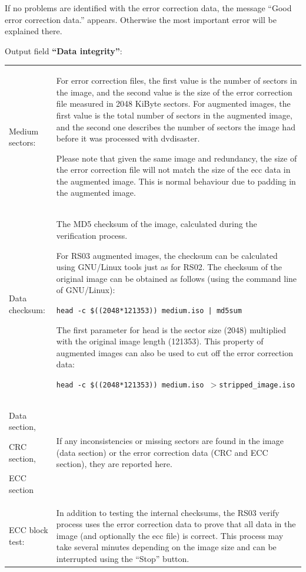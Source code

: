 If no problems are identified with the error correction data,
the message ``\textcolor{dkgreen}{Good error correction data.}'' appears.
Otherwise the most important error will be explained there. 

\bigskip

Output field {\bf ``Data integrity''}:

\medskip

\begin{tabular}{p{29mm}p{125mm}}
  Medium sectors: &
  For error correction files, the first value is the number of
  sectors in the image, and the second value is the size of
  the error correction file measured in 2048 KiByte sectors.
  For augmented images, the first value is the total number of
  sectors in the augmented image, and the second one describes
  the number of sectors the image had before it was processed with dvdisaster.

  \smallskip
  
  Please note that given the same image and redundancy, the size of
  the error correction file will not match the size of the ecc data
  in the augmented image. This is normal behaviour due to padding
  in the augmented image.\\[2mm]
 	
  Data checksum: &
  The MD5 checksum of the image, calculated during the verification process.

  \smallskip
  
  For RS03 augmented images, the checksum can be calculated using
  GNU/Linux tools just as for RS02. The checksum of the original image
  can be obtained as follows (using the command line of GNU/Linux):

  \smallskip
  
  {\tt head -c \$((2048*121353)) medium.iso | md5sum}

  \smallskip
    
  The first parameter for head is the sector size (2048) multiplied
  with the original image length (121353). This property of augmented
  images can also be used to cut off the error correction data:

  \smallskip

  {\tt head -c \$((2048*121353)) medium.iso $>$stripped\_image.iso}\\[2mm]

    Data section,\par
    CRC section,\par
    ECC section &
  If any inconsistencies or missing sectors are found in the
  image (data section) or the error correction data (CRC and ECC section),
  they are reported here.\\[2mm]
 	
  ECC block test: &
  In addition to testing the internal checksums, the RS03
  verify process uses the error correction data to prove
  that all data in the image (and optionally the ecc file)
  is correct. This process may take several minutes depending
  on the image size and can be interrupted using the ``Stop'' button. \\
\end{tabular}

